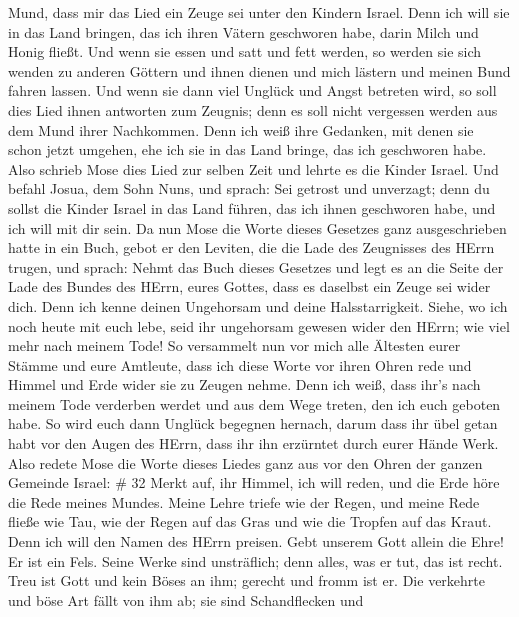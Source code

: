 Mund, dass mir das Lied ein Zeuge sei unter den Kindern Israel.
 Denn ich will sie in das Land bringen, das ich ihren
Vätern geschworen habe, darin Milch und Honig fließt. Und wenn sie essen
und satt und fett werden, so werden sie sich wenden zu anderen Göttern
und ihnen dienen und mich lästern und meinen Bund fahren lassen.
 Und wenn sie dann viel Unglück und Angst betreten wird, so
soll dies Lied ihnen antworten zum Zeugnis; denn es soll nicht vergessen
werden aus dem Mund ihrer Nachkommen. Denn ich weiß ihre Gedanken, mit
denen sie schon jetzt umgehen, ehe ich sie in das Land bringe, das ich
geschworen habe.  Also schrieb Mose dies Lied zur selben
Zeit und lehrte es die Kinder Israel.  Und befahl Josua,
dem Sohn Nuns, und sprach: Sei getrost und unverzagt; denn du sollst die
Kinder Israel in das Land führen, das ich ihnen geschworen habe, und ich
will mit dir sein.  Da nun Mose die Worte dieses Gesetzes
ganz ausgeschrieben hatte in ein Buch,  gebot er den
Leviten, die die Lade des Zeugnisses des HErrn trugen, und sprach:
 Nehmt das Buch dieses Gesetzes und legt es an die Seite
der Lade des Bundes des HErrn, eures Gottes, dass es daselbst ein Zeuge
sei wider dich.  Denn ich kenne deinen Ungehorsam und deine
Halsstarrigkeit. Siehe, wo ich noch heute mit euch lebe, seid ihr
ungehorsam gewesen wider den HErrn; wie viel mehr nach meinem Tode!
 So versammelt nun vor mich alle Ältesten eurer Stämme und
eure Amtleute, dass ich diese Worte vor ihren Ohren rede und Himmel und
Erde wider sie zu Zeugen nehme.  Denn ich weiß, dass ihr's
nach meinem Tode verderben werdet und aus dem Wege treten, den ich euch
geboten habe. So wird euch dann Unglück begegnen hernach, darum dass ihr
übel getan habt vor den Augen des HErrn, dass ihr ihn erzürntet durch
eurer Hände Werk.  Also redete Mose die Worte dieses Liedes
ganz aus vor den Ohren der ganzen Gemeinde Israel: \# 32 
Merkt auf, ihr Himmel, ich will reden, und die Erde höre die Rede meines
Mundes.  Meine Lehre triefe wie der Regen, und meine Rede
fließe wie Tau, wie der Regen auf das Gras und wie die Tropfen auf das
Kraut.  Denn ich will den Namen des HErrn preisen. Gebt
unserem Gott allein die Ehre!  Er ist ein Fels. Seine Werke
sind unsträflich; denn alles, was er tut, das ist recht. Treu ist Gott
und kein Böses an ihm; gerecht und fromm ist er.  Die
verkehrte und böse Art fällt von ihm ab; sie sind Schandflecken und
